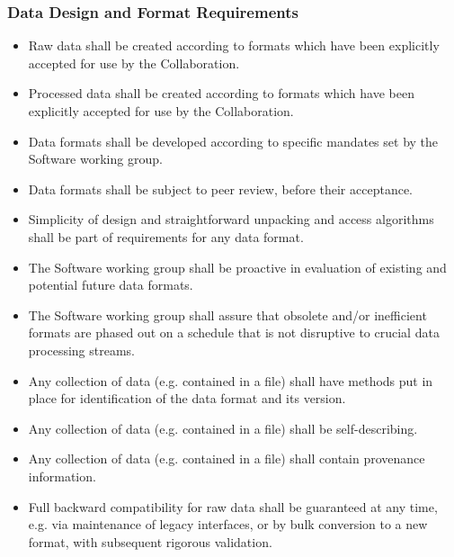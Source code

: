 \subsubsection{Data Design and Format Requirements}

\begin{itemize}
\item Raw data shall be created according to formats which have been explicitly accepted for use by the Collaboration.

\item Processed data shall be created according to formats which have been explicitly accepted for use by the Collaboration.

\item Data formats shall be developed according to specific mandates set by the Software working group.

\item Data formats shall be subject to peer review, before their acceptance.

\item Simplicity of design and straightforward unpacking and access algorithms shall be part of requirements for any data format.

\item The Software working group shall be proactive in evaluation of existing and potential future data formats.

\item The Software working group shall assure that obsolete and/or inefficient formats are phased out on a schedule that is not disruptive to crucial data processing streams.

\item Any collection of data (e.g. contained in a file) shall have methods put in place for identification of the data format and its version.

\item Any collection of data (e.g. contained in a file) shall be self-describing.

\item Any collection of data (e.g. contained in a file) shall contain provenance information.

\item Full backward compatibility for raw data shall be guaranteed at any time, e.g. via maintenance of legacy interfaces, or by bulk conversion to a new format, with subsequent rigorous validation.
\end{itemize}

